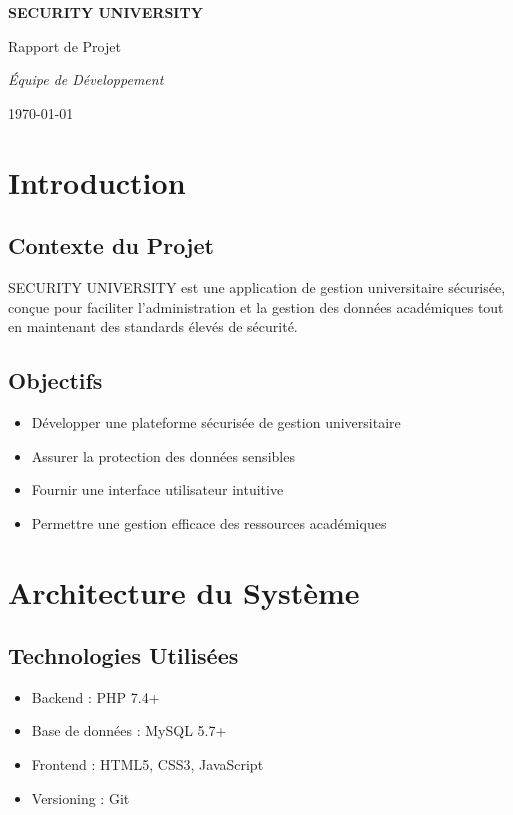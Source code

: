 \documentclass[12pt,a4paper]{report}
\begin{document}
\begin{titlepage}
    \centering
    \vspace*{1cm}
    {\huge\bfseries SECURITY UNIVERSITY\par}
    \vspace{1cm}
    {\Large Rapport de Projet\par}
    \vspace{1.5cm}
    {\large\itshape Équipe de Développement\par}
    \vfill
    {\large \today\par}
\end{titlepage}

\tableofcontents
\newpage

\chapter{Introduction}
\section{Contexte du Projet}
SECURITY UNIVERSITY est une application de gestion universitaire sécurisée, conçue pour faciliter l'administration et la gestion des données académiques tout en maintenant des standards élevés de sécurité.

\section{Objectifs}
\begin{itemize}
    \item Développer une plateforme sécurisée de gestion universitaire
    \item Assurer la protection des données sensibles
    \item Fournir une interface utilisateur intuitive
    \item Permettre une gestion efficace des ressources académiques
\end{itemize}

\chapter{Architecture du Système}
\section{Technologies Utilisées}
\begin{itemize}
    \item Backend : PHP 7.4+
    \item Base de données : MySQL 5.7+
    \item Frontend : HTML5, CSS3, JavaScript
    \item Versioning : Git
\end{itemize}
\end{document}
